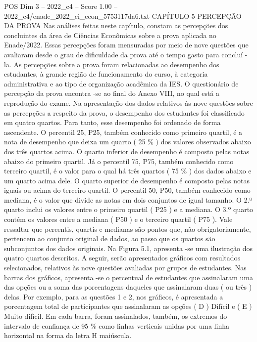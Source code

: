 \begin{textsample}{POS Dim 3 – 2022\_c4 – Score 1.00 – 2022\_c4/enade\_2022\_ci\_econ\_5753117da6.txt}  \label{ex:f3_pos_172}
CAPÍTULO 5 PERCEPÇÃO DA PROVA Nas análises feitas neste capítulo, constam as percepções dos concluintes da área de Ciências Econômicas sobre a prova aplicada no Enade/2022.
Essas percepções foram mensuradas por meio de nove questões que avaliaram desde o grau de dificuldade da prova até o tempo gasto para concluí -la.
As percepções sobre a prova foram relacionadas ao desempenho dos estudantes, à grande região de funcionamento do curso, à categoria administrativa e ao tipo de organização acadêmica da IES.
O questionário de percepção da prova encontra -se ao final do Anexo VIII, no qual está a reprodução do exame.
Na apresentação dos dados relativos às nove questões sobre as percepções a respeito da prova, o desempenho dos estudantes foi classificado em quatro quartos.
Para tanto, esse desempenho foi ordenado de forma ascendente.
O percentil 25, P25, também conhecido como primeiro quartil, é a nota de desempenho que deixa um quarto ( 25 \% ) dos valores observados abaixo dos três quartos acima.
O quarto inferior de desempenho é composto pelas notas abaixo do primeiro quartil.
Já o percentil 75, P75, também conhecido como terceiro quartil, é o valor para o qual há três quartos ( 75 \% ) dos dados abaixo e um quarto acima dele.
O quarto superior de desempenho é composto pelas notas iguais ou acima do terceiro quartil.
O percentil 50, P50, também conhecido como mediana, é o valor que divide as notas em dois conjuntos de igual tamanho.
O 2.º quarto inclui os valores entre o primeiro quartil ( P25 ) e a mediana.
O 3.º quarto contém os valores entre a mediana ( P50 ) e o terceiro quartil ( P75 ).
Vale ressaltar que percentis, quartis e medianas são pontos que, não obrigatoriamente, pertencem ao conjunto original de dados, ao passo que os quartos são subconjuntos dos dados originais.
Na Figura 5.1, apresenta -se uma ilustração dos quatro quartos descritos.
A seguir, serão apresentados gráficos com resultados selecionados, relativos às nove questões avaliadas por grupos de estudantes.
Nas barras dos gráficos, apresenta -se o percentual de estudantes que assinalaram uma das opções ou a soma das porcentagens daqueles que assinalaram duas ( ou três ) delas.
Por exemplo, para as questões 1 e 2, nos gráficos, é apresentada a porcentagem total de participantes que assinalaram as opções ( D ) Difícil e ( E ) Muito difícil.
Em cada barra, foram assinalados, também, os extremos do intervalo de confiança de 95 \% como linhas verticais unidas por uma linha horizontal na forma da letra H maiúscula.

\end{textsample}
